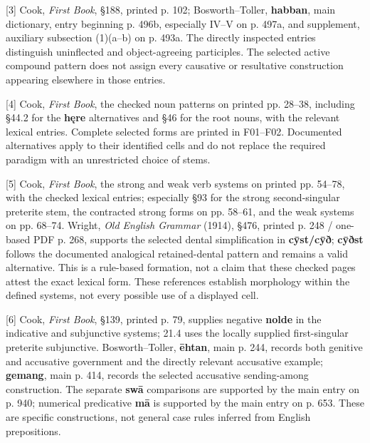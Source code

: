 [3] Cook, \emph{First Book}, §188, printed p. 102; Bosworth–Toller, \textbf{habban}, main dictionary, entry beginning p. 496b, especially IV–V on p. 497a, and supplement, auxiliary subsection (1)(a–b) on p. 493a. The directly inspected entries distinguish uninflected and object-agreeing participles. The selected active compound pattern does not assign every causative or resultative construction appearing elsewhere in those entries.

[4] Cook, \emph{First Book}, the checked noun patterns on printed pp. 28–38, including §44.2 for the \textbf{hęre} alternatives and §46 for the root nouns, with the relevant lexical entries. Complete selected forms are printed in F01–F02. Documented alternatives apply to their identified cells and do not replace the required paradigm with an unrestricted choice of stems.

[5] Cook, \emph{First Book}, the strong and weak verb systems on printed pp. 54–78, with the checked lexical entries; especially §93 for the strong second-singular preterite stem, the contracted strong forms on pp. 58–61, and the weak systems on pp. 68–74. Wright, \emph{Old English Grammar} (1914), §476, printed p. 248 /\allowbreak{} one-based PDF p. 268, supports the selected dental simplification in \textbf{cȳst/\allowbreak{}cȳð}; \textbf{cȳðst} follows the documented analogical retained-dental pattern and remains a valid alternative. This is a rule-based formation, not a claim that these checked pages attest the exact lexical form. These references establish morphology within the defined systems, not every possible use of a displayed cell.

[6] Cook, \emph{First Book}, §139, printed p. 79, supplies negative \textbf{nolde} in the indicative and subjunctive systems; 21.4 uses the locally supplied first-singular preterite subjunctive. Bosworth–Toller, \textbf{ēhtan}, main p. 244, records both genitive and accusative government and the directly relevant accusative example; \textbf{gemang}, main p. 414, records the selected accusative sending-among construction. The separate \textbf{swā} comparisons are supported by the main entry on p. 940; numerical predicative \textbf{mā} is supported by the main entry on p. 653. These are specific constructions, not general case rules inferred from English prepositions.

